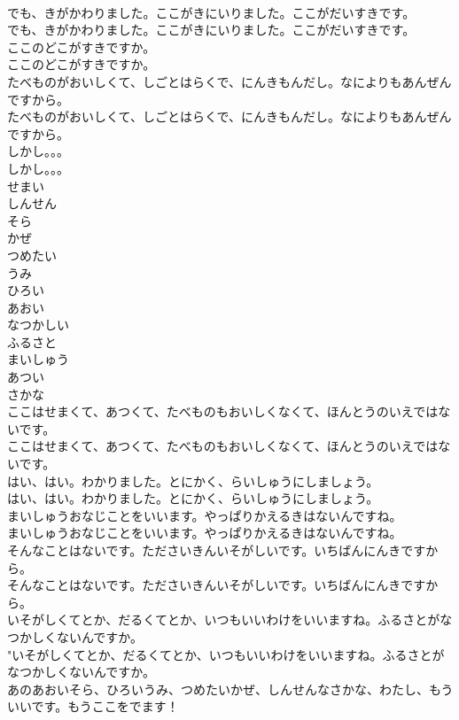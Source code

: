\documentclass[8pt]{extreport}
\begin{document}
\begin{CJK}{UTF8}{min}
\\	でも、きがかわりました。ここがきにいりました。ここがだいすきです。	
\\	でも、きがかわりました。ここがきにいりました。ここがだいすきです。 
\\	ここのどこがすきですか。	
\\	ここのどこがすきですか。 
\\	たべものがおいしくて、しごとはらくで、にんきもんだし。なによりもあんぜんですから。	
\\	たべものがおいしくて、しごとはらくで、にんきもんだし。なによりもあんぜんですから。 
\\	しかし。。。	
\\	しかし。。。 
\\	せまい
\\	しんせん
\\	そら
\\	かぜ
\\	つめたい
\\	うみ
\\	ひろい
\\	あおい
\\	なつかしい
\\	ふるさと
\\	まいしゅう
\\	あつい
\\	さかな
\\	ここはせまくて、あつくて、たべものもおいしくなくて、ほんとうのいえではないです。	
\\	ここはせまくて、あつくて、たべものもおいしくなくて、ほんとうのいえではないです。 
\\	はい、はい。わかりました。とにかく、らいしゅうにしましょう。	
\\	はい、はい。わかりました。とにかく、らいしゅうにしましょう。 
\\	まいしゅうおなじことをいいます。やっぱりかえるきはないんですね。	
\\	まいしゅうおなじことをいいます。やっぱりかえるきはないんですね。 
\\	そんなことはないです。たださいきんいそがしいです。いちばんにんきですから。	
\\	そんなことはないです。たださいきんいそがしいです。いちばんにんきですから。 
\\	いそがしくてとか、だるくてとか、いつもいいわけをいいますね。ふるさとがなつかしくないんですか。	
\\	"いそがしくてとか、だるくてとか、いつもいいわけをいいますね。ふるさとがなつかしくないんですか。 
\\	あのあおいそら、ひろいうみ、つめたいかぜ、しんせんなさかな、わたし、もういいです。もうここをでます！	

\end{CJK}
\end{document}
